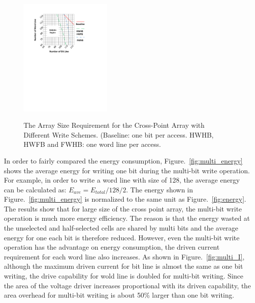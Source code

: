 \begin{figure}%
\centering
  \includegraphics[width=0.4\textwidth]{./figures/multiwrite.pdf}\\
  \caption{The Array Size Requirement for the Cross-Point Array with Different Write Schemes. (Baseline: one bit per access. HWHB, HWFB and FWHB: one word line per access. }\label{fig:reliable_region}
\end{figure}

In order to fairly compared the energy consumption, Figure.~\ref{fig:multi_energy} shows the average energy for writing one bit during the multi-bit write operation. For example, in order to write a word line with size of 128, the average energy can be calculated as:
$E_{ave}=E_{total}/128/2$. The energy shown in Figure.~\ref{fig:multi_energy} is normalized to the same unit as Figure.~\ref{fig:energy}. The results show that for large size of the cross point array, the multi-bit write operation is much more energy efficiency. The reason is that the energy wasted at the unselected and half-selected cells are shared by multi bits and the average energy for one each bit is therefore reduced. However, even the multi-bit write operation has the advantage on energy consumption, the driven current requirement for each word line also increases. As shown in Figure.~\ref{fig:multi_I}, although the maximum driven current for bit line is almost the same as one bit writing, the drive capability for wold line is doubled for multi-bit writing. Since the area of the voltage driver increases proportional with its driven capability, the area overhead for multi-bit writing is about 50\% larger than one bit writing.


